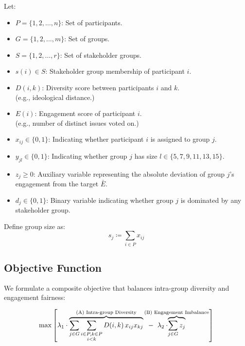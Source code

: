 Let:
\begin{itemize}
    \item $P = \{1, 2, \dots, n\}$: Set of participants.
    \item $G = \{1, 2, \dots, m\}$: Set of groups.
    \item $S = \{1, 2, \dots, r\}$: Set of stakeholder groups.
    \item $s(i) \in S$: Stakeholder group membership of participant $i$.
    \item $D(i,k)$: Diversity score between participants $i$ and $k$.\\(e.g., ideological distance.)
    \item $E(i)$: Engagement score of participant $i$.\\(e.g., number of distinct issues voted on.)
    \item $x_{ij} \in \{0,1\}$: Indicating whether participant $i$ is assigned to group $j$.
    \item $y_{jl} \in \{0,1\}$: Indicating whether group $j$ has size $l \in \{5,7,9,11,13,15\}$.
    \item $z_j \geq 0$: Auxiliary variable representing the absolute deviation of group $j$’s engagement from the target $\bar{E}$.
    \item $d_j \in \{0,1\}$: Binary variable indicating whether group $j$ is dominated by any stakeholder group.
\end{itemize}

Define group size as:
\[
s_j \coloneqq \sum_{i \in P} x_{ij}
\]

\subsection*{Objective Function}

We formulate a composite objective that balances intra-group diversity and engagement fairness:

\[
\max \left[
\lambda_1 \cdot \overbrace{
\sum_{j \in G} \sum_{\substack{i \in P, k \in P \\ i < k}} D(i,k)\,x_{ij} x_{kj}
  }^{\text{(A) Intra-group Diversity}}
\hspace{0.2cm} - \hspace{0.2cm} \lambda_2 \cdot \hspace{-1.3cm} \overbrace{
\sum_{j \in G} z_j
}^{\text{(B) Engagement Imbalance}}
\right]
\]

